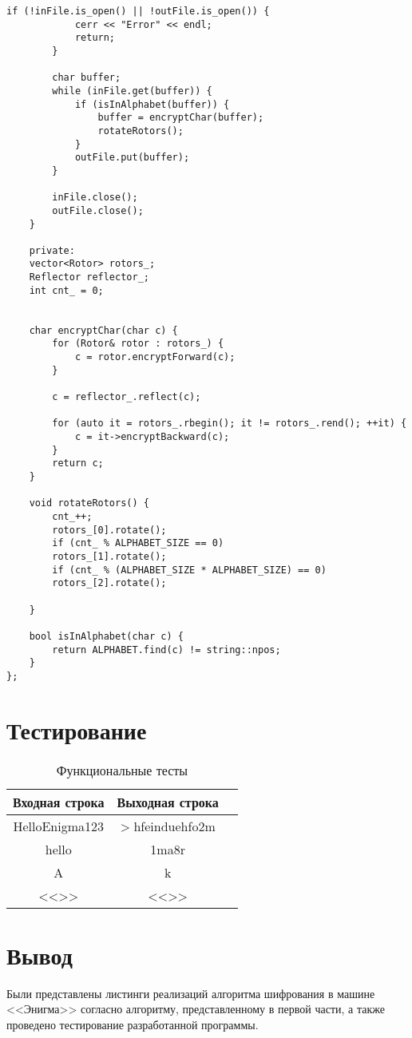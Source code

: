 \begin{center}
\begin{lstlisting}[label=lst:enigma1,caption=Реализация алгоритма шифрования машины <<Энигма>>]
		if (!inFile.is_open() || !outFile.is_open()) {
			cerr << "Error" << endl;
			return;
		}
		
		char buffer;
		while (inFile.get(buffer)) {
			if (isInAlphabet(buffer)) {
				buffer = encryptChar(buffer);
				rotateRotors();
			}
			outFile.put(buffer);
		}
		
		inFile.close();
		outFile.close();
	}
	
	private:
	vector<Rotor> rotors_;
	Reflector reflector_;
	int cnt_ = 0;
	

	char encryptChar(char c) {
		for (Rotor& rotor : rotors_) {
			c = rotor.encryptForward(c);
		}
		
		c = reflector_.reflect(c);
		
		for (auto it = rotors_.rbegin(); it != rotors_.rend(); ++it) {
			c = it->encryptBackward(c);
		}
		return c;
	}
	
	void rotateRotors() {
		cnt_++;
		rotors_[0].rotate();
		if (cnt_ % ALPHABET_SIZE == 0)
		rotors_[1].rotate();
		if (cnt_ % (ALPHABET_SIZE * ALPHABET_SIZE) == 0)
		rotors_[2].rotate();
		
	}
	
	bool isInAlphabet(char c) {
		return ALPHABET.find(c) != string::npos;
	}
};

\end{lstlisting}
\end{center}

\section{Тестирование}
\begin{table}[ht!]
	\begin{center}
		\captionsetup{justification=raggedright,singlelinecheck=off}
		\caption{\label{tbl:functional_test} Функциональные тесты}
		\begin{tabular}{|c|c|c|}
			\hline
			Входная строка & Выходная строка \\ 
			\hline
			HelloEnigma123 & >hfeinduehfo2m \\
			hello  & 1ma8r\\
			A & k\\
			<<>>  & <<>>\\
			\hline
		\end{tabular}
	\end{center}
\end{table}

\section*{Вывод}

Были представлены листинги реализаций алгоритма шифрования в машине <<Энигма>> согласно алгоритму, представленному в первой части, а также проведено тестирование разработанной программы.